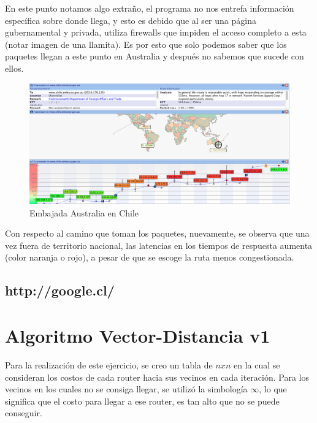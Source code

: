 \documentclass[a4papaer]{article}
\begin{document}
En este punto notamos algo extraño, el programa no nos entrefa información específica sobre donde llega, y esto es debido que al ser una página gubernamental y privada, utiliza firewalls que impiden el acceso completo a esta (notar imagen de una llamita). Es por esto que solo podemos saber que los paquetes llegan a este punto en Australia y después no sabemos que sucede con ellos.

\pagebreak

\begin{figure}[h]
  \centering
    \includegraphics[width=1\textwidth]{au2}
  \caption{Embajada Australia en Chile}
  \label{fig:Trace Route de http://www.chile.embassy.gov.au/}
\end{figure}

Con respecto al camino que toman los paquetes, nuevamente, se observa que una vez fuera de territorio nacional, las latencias en los tiempos de respuesta aumenta (color naranja o rojo), a pesar de que se escoge la ruta menos congestionada.

\pagebreak

\subsection{http://google.cl/}

\pagebreak

\section{Algoritmo Vector-Distancia v1}
 
Para la realización de este ejercicio, se creo un tabla de $nxn$ en la cual se consideran los costos de cada router hacia sus vecinos en cada iteración. Para los vecinos en los cuales no se consiga llegar, se utilizó la simbología $\infty$, lo que significa que el costo para llegar a ese router, es tan alto que no se puede conseguir. 
\end{document}
